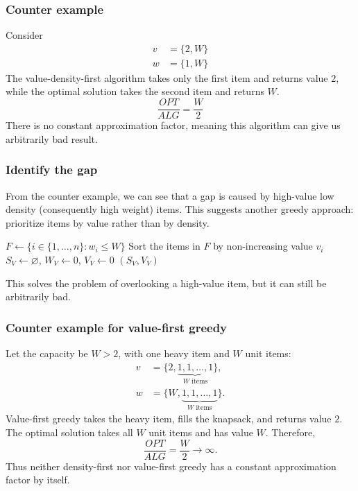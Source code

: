 \documentclass[10pt]{article}
\theoremstyle{definition}
\begin{document}
\subsubsection*{Counter example}
Consider 
\begin{align*}
  v &= \{2, W\}\\
  w &= \{1, W\}
\end{align*}
The value-density-first algorithm takes only the first item and returns value $2$, while the optimal solution takes the second item and returns $W$. 
\[\frac{OPT}{ALG} = \frac{W}{2}\]
There is no constant approximation factor, meaning this algorithm can give us arbitrarily bad result. 
\subsubsection*{Identify the gap}
From the counter example, we can see that a gap is caused by high-value low density (consequently high weight) items. 
This suggests another greedy approach: prioritize items by value rather than by density.

\begin{algorithm}[H]
  \caption{Value-first greedy for 0/1 knapsack}
  $F \gets \{i \in \{1,\ldots,n\}:w_i\leq W\}$\;
  Sort the items in $F$ by non-increasing value $v_i$\;
  $S_V \gets \varnothing$, $W_V \gets 0$, $V_V \gets 0$\;
  \Return $(S_V,V_V)$\;
\end{algorithm}

This solves the problem of overlooking a high-value item, but it can still be arbitrarily bad.
\subsubsection*{Counter example for value-first greedy}
Let the capacity be $W>2$, with one heavy item and $W$ unit items:
\begin{align*}
  v &= \{2, \underbrace{1,1,\ldots,1}_{W\text{ items}}\},\\
  w &= \{W, \underbrace{1,1,\ldots,1}_{W\text{ items}}\}.
\end{align*}
Value-first greedy takes the heavy item, fills the knapsack, and returns value $2$. The optimal solution takes all $W$ unit items and has value $W$. Therefore,
\[
  \frac{OPT}{ALG}=\frac{W}{2}\longrightarrow\infty.
\]
Thus neither density-first nor value-first greedy has a constant approximation factor by itself.
\end{document}
